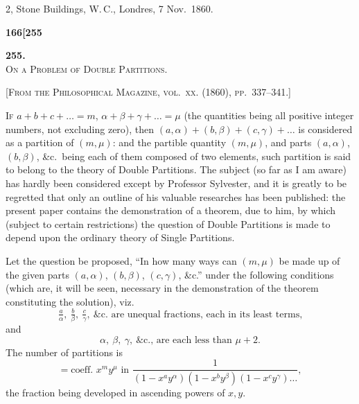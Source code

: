 \documentclass[11pt]{article}
\begin{document}
\medskip

\hfill 2, Stone Buildings, W.\,C., Londres, 7 Nov.\ 1860.

\newpage


\noindent\textbf{166}\hfill\hfill\textbf{[255}

\medskip

\begin{center}
\textbf{255.}\\[0.6em]
{\Large\textsc{On a Problem of Double Partitions.}}
\end{center}

\medskip

\textsc{[From the Philosophical Magazine, vol.~xx. (1860), pp.~337--341.]}

\medskip

\textsc{If} $a + b + c + \ldots = m$, $\alpha + \beta + \gamma + \ldots = \mu$ (the quantities being all positive integer numbers, not excluding zero), then $(a, \alpha) + (b, \beta) + (c, \gamma) + \ldots$ is considered as a partition of $(m, \mu)$: and the partible quantity $(m, \mu)$, and parts $(a, \alpha)$, $(b, \beta)$, \&c.\ being each of them composed of two elements, such partition is said to belong to the theory of Double Partitions. The subject (so far as I am aware) has hardly been considered except by Professor Sylvester, and it is greatly to be regretted that only an outline of his valuable researches has been published: the present paper contains the demonstration of a theorem, due to him, by which (subject to certain restrictions) the question of Double Partitions is made to depend upon the ordinary theory of Single Partitions.

Let the question be proposed, ``In how many ways can $(m, \mu)$ be made up of the given parts $(a, \alpha)$, $(b, \beta)$, $(c, \gamma)$, \&c.'' under the following conditions (which are, it will be seen, necessary in the demonstration of the theorem constituting the solution), viz.
\[
\tfrac{a}{\alpha},\ \tfrac{b}{\beta},\ \tfrac{c}{\gamma},\ \text{\&c.\ are unequal fractions, each in its least terms,}
\]
and
\[
\alpha,\ \beta,\ \gamma,\ \text{\&c., are each less than } \mu + 2.
\]
The number of partitions is
\[
= \text{coeff.\ } x^m y^{\mu} \text{ in } \frac{1}{(1 - x^a y^{\alpha})(1 - x^b y^{\beta})(1 - x^c y^{\gamma})\ldots},
\]
the fraction being developed in ascending powers of $x, y$.
\end{document}

